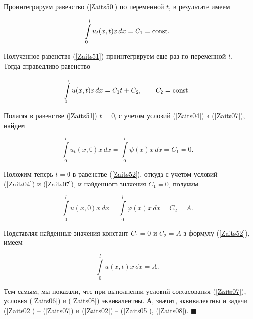 Проинтегрируем равенство (\ref{Zaits50}) по переменной $t$, в результате имеем

\begin{equation}

\label{Zaits51}

\int\limits_0^lu_t(x,t)x\,dx=C_1={\rm const}.

\end{equation}

Полученное равенство (\ref{Zaits51}) проинтегрируем еще раз по переменной $t$. Тогда справедливо равенство

\begin{equation}

\label{Zaits52}

\int\limits_0^lu(x,t)x\,dx=C_1t+C_2,\qquad C_2={\rm const}.

\end{equation}

Полагая в равенстве (\ref{Zaits51}) $t=0$, с учетом условий (\ref{Zaits04}) и (\ref{Zaits07}), найдем

$$\int\limits_0^lu_t(x,0)x\,dx=\int\limits_0^l\psi(x)x\,dx=C_1=0.$$



Положим теперь $t=0$ в равенстве (\ref{Zaits52}), откуда с учетом условий (\ref{Zaits04}) и (\ref{Zaits07}), и найденного значения $C_1=0$, получим

$$\int\limits_0^lu(x,0)x\,dx=\int\limits_0^l\varphi(x)x\,dx=C_2=A.$$



Подставляя найденные значения констант $C_1=0$ и $C_2=A$ в формулу (\ref{Zaits52}), имеем

\begin{equation}

\label{Zaits53}

\int\limits_0^lu(x,t)x\,dx=A.

\end{equation}

Тем самым, мы показали, что при выполнении условий согласования (\ref{Zaits07}), условия (\ref{Zaits06}) и (\ref{Zaits08}) эквивалентны. А, значит, эквивалентны и задачи (\ref{Zaits02}) -- (\ref{Zaits07}) и (\ref{Zaits02}) -- (\ref{Zaits05}), (\ref{Zaits08}). $\blacksquare$















